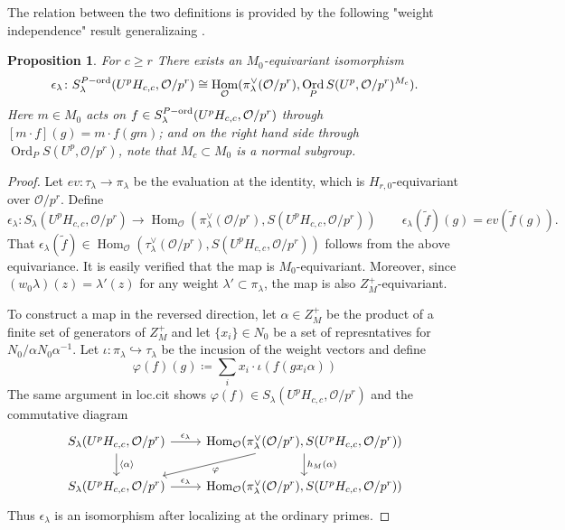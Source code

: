 \documentclass[leqno]{amsart}
\DeclareMathOperator{\Ord}{Ord}
\newcommand{\ord}{\textnormal{ord}}
\newcommand{\oo}{\mathcal O}
\newcommand{\1}{\mathbf{1}}
\DeclareMathOperator{\Hom}{Hom}
\newtheorem{prop}[thm]{Proposition}
\theoremstyle{definition}
\theoremstyle{remark}
\begin{document}
The relation between the two definitions
is provided by the following "weight independence" result
generalizaing \cite[Prop 2.22]{ger}.
\begin{prop}
	For $c\geq r$ There exists an $M_0$-equivariant isomorphism
	\[
		\epsilon_\lambda
		\colon S_{\lambda}^{P-\ord}(U^pH_{c,c}, \oo/p^r)\cong 
		\Hom_{\oo}(\pi_\lambda^\vee(\oo/p^r),
		\Ord_PS(U^p,\oo/p^r)^{M_c}).
	\]
	Here $m\in M_0$ acts on  $f\in S_\lambda^{P-\ord}(U^pH_{c,c},\oo/p^r)$
	through $[m\cdot f](g)=m\cdot f(gm)$;
	and on the right hand side through 
	$\Ord_PS(U^p,\oo/p^r)$,
	note that $M_c\subset M_0$ is a normal subgroup.
\end{prop}
\begin{proof}
	Let $ev\colon \tau_\lambda\to \pi_\lambda$ 
	be the evaluation at the identity, which is 
	$H_{r,0}$-equivariant over $\oo/p^r$.
	Define 
	\[
	\epsilon_{\lambda}\colon S_\lambda(U^pH_{c,c}, \oo/p^r)\to 
	\Hom_{\oo}(\pi_\lambda^\vee(\oo/p^r), S(U^pH_{c,c},\oo/p^r))\qquad
	\epsilon_{\lambda}(\tilde{f})(g)=
	ev(\tilde{f}(g)).
	\]
	That $\epsilon_\lambda(\tilde{f})\in 	
	\Hom_{\oo}(\tau_\lambda^\vee(\oo/p^r), S(U^pH_{c,c},\oo/p^r))$
	follows from the above equivariance.
	It is easily verified that 
	the map is $M_0$-equivariant.
	Moreover, since
	$(w_0\lambda)(z)=\lambda'(z)$
	for any weight $\lambda'\subset \pi_\lambda$,
	the map is also $Z_M^+$-equivariant.

	To construct a map in the reversed direction,
	let $\alpha\in Z_M^+$ be the product
	of a finite set of generators of $Z_M^+$
	and let $ \{x_i\}\in N_0$
	be a set of represntatives for $N_0/\alpha N_0\alpha^{-1}$.
	Let $\iota\colon \pi_\lambda\hookrightarrow \tau_\lambda$
	be the incusion of the weight vectors and define 
	\[
	\varphi(f)(g)\coloneqq \sum_i x_i\cdot \iota(f(gx_i\alpha))	
	\]
	The same argument in loc.cit shows 
	$\varphi(f)\in S_\lambda(U^pH_{c,c},\oo/p^r)$
	and the commutative diagram 
	\[
	\begin{tikzcd}
		S_\lambda(U^pH_{c,c},\oo/p^r)
		\arrow[r,"\epsilon_{\lambda}"]
		\arrow[d,"\langle\alpha\rangle"]
		& \Hom_\oo(\pi_\lambda^\vee(\oo/p^r), S(U^pH_{c,c},\oo/p^r))
		\arrow[d,"h_M(\alpha)"]
		\arrow[dl,"\varphi"]\\
		S_\lambda(U^pH_{c,c},\oo/p^r)
		\arrow[r,"\epsilon_{\lambda}"]
		& \Hom_\oo(\pi_\lambda^\vee(\oo/p^r), S(U^pH_{c,c},\oo/p^r))
	\end{tikzcd}	
	\]
	Thus $\epsilon_{\lambda}$ is an isomorphism
	after localizing at the ordinary primes. 
\end{proof}
\end{document}
